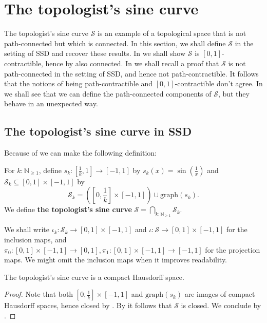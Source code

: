 \section{The topologist's sine curve}
The topologist's sine curve $\mathcal S$ is an example of a topological space that is not path-connected but which is connected. In this section, we shall define $\mathcal S$ in the setting of SSD and recover these results. 
In  we shall show $\mathcal S$ is $[0,1]$-contractible, hence by  also connected. 
In  we shall recall a proof that $\mathcal S$ is not path-connected in the setting of SSD, and hence not path-contractible. 
It follows that the notions of being path-contractible and $[0,1]$-contractible don't agree. 
In  we shall see that we can define the path-connected components of $\mathcal S$, but they behave in an unexpected way. 

\subsection{The topologist's sine curve in SSD}
Because of  we can make the following definition:
\begin{definition}%
  For $k:\mathbb N_{\geq1}$, define $s_k:[\frac1k,1] \to [-1,1]$ by $s_k(x) = \sin(\frac1x)$ and $\mathcal S_k \subseteq [0,1] \times [-1,1]$ by 
  $$\mathcal S_k = \left([0, \frac1k] \times [-1,1]\right) \cup \mathrm{graph}(s_k).$$
  We define \textbf{the topologist's sine curve} $\mathcal S = \bigcap_{k:\mathbb N_{\geq1}} \mathcal S_k$. 

\end{definition}
  We shall write $\iota_k : \mathcal S_k \to [0,1] \times [-1,1]$ 
  and $\iota:\mathcal S \to [0,1] \times [-1,1]$ for the inclusion maps, and $\pi_0:[0,1] \times[-1,1] \to [0,1],
\pi_1:[0,1] \times[-1,1] \to [-1,1]$ for the projection maps. 
We might omit the inclusion maps when it improves readability. 


\begin{lemma}
  The topologist's sine curve is a compact Hausdorff space.
\end{lemma}
\begin{proof}
  Note that both $[0,\frac1k] \times [-1,1]$ and $\mathrm{graph}(s_k)$ are images of compact Hausdorff spaces, hence closed by .
  By  it follows that $\mathcal S$ is closed. We conclude by .
\end{proof}

